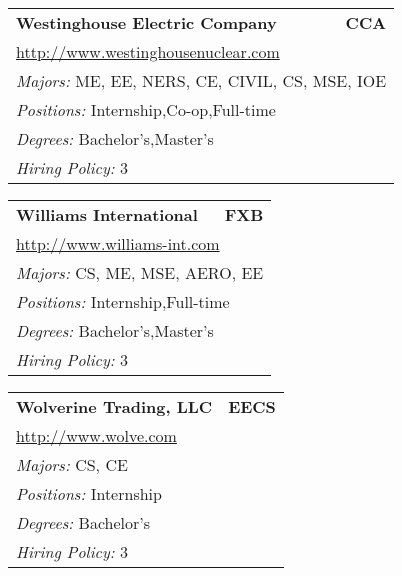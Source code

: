 \documentclass[twoside]{article}
\begin{document}
\begin{center}
\begin{multicols}{3}
\begin{FlushLeft}
\begin{minipage}{.9\columnwidth}
\end{minipage}
 
\begin{minipage}{.9\columnwidth}\begin{tabularx}{.95\columnwidth}{Xr}
                 {\Large\bf Westinghouse Electric Company} & {\Large\bf CCA}\\
    \multicolumn{2}{p{.95\columnwidth}}{\url{http://www.westinghousenuclear.com}}\\
    \multicolumn{2}{p{.95\columnwidth}}{\emph{Majors:} ME, EE, NERS, CE, CIVIL, CS, MSE, IOE}\\
    \multicolumn{2}{p{.95\columnwidth}}{\emph{Positions:} Internship,Co-op,Full-time}\\
    \multicolumn{2}{p{.95\columnwidth}}{\emph{Degrees:} Bachelor's,Master's}\\
    \multicolumn{2}{p{.95\columnwidth}}{\emph{Hiring Policy:} 3}\\
    \end{tabularx}
    
\end{minipage}
 
\begin{minipage}{.9\columnwidth}\begin{tabularx}{.95\columnwidth}{Xr}
                 {\Large\bf Williams International} & {\Large\bf FXB}\\
    \multicolumn{2}{p{.95\columnwidth}}{\url{http://www.williams-int.com}}\\
    \multicolumn{2}{p{.95\columnwidth}}{\emph{Majors:} CS, ME, MSE, AERO, EE}\\
    \multicolumn{2}{p{.95\columnwidth}}{\emph{Positions:} Internship,Full-time}\\
    \multicolumn{2}{p{.95\columnwidth}}{\emph{Degrees:} Bachelor's,Master's}\\
    \multicolumn{2}{p{.95\columnwidth}}{\emph{Hiring Policy:} 3}\\
    \end{tabularx}
    
\end{minipage}
 
\begin{minipage}{.9\columnwidth}\begin{tabularx}{.95\columnwidth}{Xr}
                 {\Large\bf Wolverine Trading, LLC} & {\Large\bf EECS}\\
    \multicolumn{2}{p{.95\columnwidth}}{\url{http://www.wolve.com}}\\
    \multicolumn{2}{p{.95\columnwidth}}{\emph{Majors:} CS, CE}\\
    \multicolumn{2}{p{.95\columnwidth}}{\emph{Positions:} Internship}\\
    \multicolumn{2}{p{.95\columnwidth}}{\emph{Degrees:} Bachelor's}\\
    \multicolumn{2}{p{.95\columnwidth}}{\emph{Hiring Policy:} 3}\\
    \end{tabularx}
    

\end{minipage}
\end{FlushLeft}
\end{multicols}
\end{center}
\end{document}
